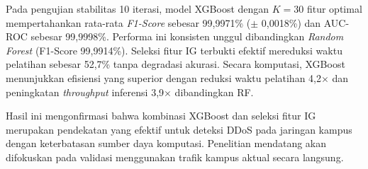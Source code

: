 \documentclass[conference,a4paper]{IEEEtran}
\begin{document}
Pada pengujian stabilitas 10 iterasi, model XGBoost dengan $K=30$ fitur optimal mempertahankan rata-rata \textit{F1-Score} sebesar 99,9971\% ($\pm$ 0,0018\%) dan AUC-ROC sebesar 99,9998\%.
Performa ini konsisten unggul dibandingkan \textit{Random Forest} (F1-Score 99,9914\%). Seleksi fitur IG terbukti efektif mereduksi waktu pelatihan sebesar 52,7\% tanpa degradasi akurasi. Secara komputasi, XGBoost menunjukkan efisiensi yang superior dengan reduksi waktu pelatihan 4,2$\times$ dan peningkatan \textit{throughput} inferensi 3,9$\times$ dibandingkan RF.

Hasil ini mengonfirmasi bahwa kombinasi XGBoost dan seleksi fitur IG merupakan pendekatan yang efektif untuk deteksi DDoS pada
jaringan kampus dengan keterbatasan sumber daya komputasi. Penelitian mendatang akan difokuskan pada validasi menggunakan trafik kampus aktual secara langsung.


\vspace{-0.2cm}
\renewcommand{\refname}{Referensi}
\renewcommand{\bibname}{Referensi}
\balance

\scriptsize

\end{document}
